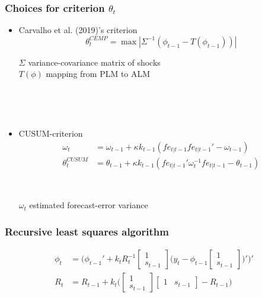 \documentclass[10pt]{beamer}
\begin{document}
\begin{frame}[plain]  %
	\frametitle{Choices for criterion $\theta_t$}
	\label{g}
\begin{itemize}
\item Carvalho et al. (2019)'s criterion  
\begin{equation}
\theta_t^{CEMP} = \max | \Sigma^{-1} ( \phi_{t-1} - T(\phi_{t-1})) |
\end{equation}


$\Sigma$ variance-covariance matrix of shocks \\
$T(\phi)$ mapping from PLM to ALM

\

\

\item CUSUM-criterion
\begin{align}
\omega_t & =  \omega_{t-1} + \kappa k_{t-1}(fe_{t|t-1} fe_{t|t-1}'  -\omega_{t-1})\\
\theta_t^{CUSUM} & =  \theta_{t-1} + \kappa k_{t-1}(fe_{t|t-1}'\omega_t^{-1}fe_{t|t-1} -\theta_{t-1})
\end{align}

\

$\omega_t$ estimated forecast-error variance
\end{itemize}




\vfill

\hyperlink{anchoring1}{}	


\end{frame}

\begin{frame}[plain]  %
	\frametitle{Recursive least squares algorithm}
	\label{RLS}


\begin{align}
\phi_t  & = \bigg( \phi_{t-1}' + k_t R_t^{-1}\begin{bmatrix} 1 \\ s_{t-1} \end{bmatrix}\bigg(y_{t} - \phi_{t-1} \begin{bmatrix} 1 \\ s_{t-1} \end{bmatrix} \bigg)' \bigg)' \\
R_t &= R_{t-1} +  k_t \bigg( \begin{bmatrix} 1 \\ s_{t-1} \end{bmatrix} \begin{bmatrix} 1 & s_{t-1} \end{bmatrix}  - R_{t-1} \bigg)
\end{align}


\vfill

\hyperlink{RLS_special}{}	


\end{frame}
\end{document}
